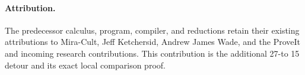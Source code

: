\documentclass[11pt]{article}
\begin{document}
\paragraph{Attribution.}
The predecessor calculus, program, compiler, and reductions retain their
existing attributions to Mira-Cult, Jeff Ketchersid, Andrew James Wade,
and the ProveIt and incoming research contributions. This contribution
is the additional 27-to 15 detour and its exact local comparison proof.
\end{document}

